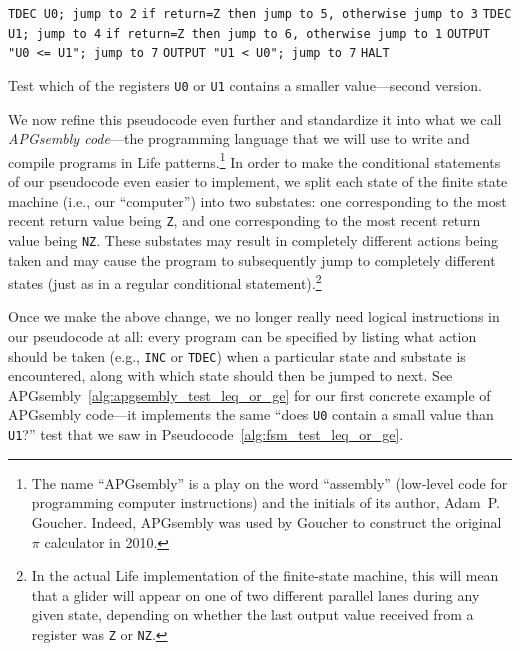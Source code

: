 \begin{pseudocode}
	\begin{algorithmic}[1]\small
		\State \texttt{TDEC U0; jump to 2}
		\State \texttt{if return=Z then jump to 5, otherwise jump to 3}
		\State \texttt{TDEC U1; jump to 4}
		\State \texttt{if return=Z then jump to 6, otherwise jump to 1}
		\State \texttt{OUTPUT "U0 <= U1"; jump to 7}
		\State \texttt{OUTPUT "U1 < U0"; jump to 7}
		\State \texttt{HALT}
	\end{algorithmic}
	\caption{Test which of the registers \texttt{U0} or \texttt{U1} contains a smaller value---second version.}\label{alg:fsm_test_leq_or_ge}
\end{pseudocode}

We now refine this pseudocode even further and standardize it into what we call \emph{APGsembly code}---the programming language that we will use to write and compile programs in Life patterns.\footnote{The name ``APGsembly'' is a play on the word ``assembly'' (low-level code for programming computer instructions) and the initials of its author, Adam~P. Goucher. Indeed, APGsembly was used by Goucher to construct the original $\pi$ calculator in 2010.} In order to make the conditional statements of our pseudocode even easier to implement, we split each state of the finite state machine (i.e., our ``computer'') into two substates: one corresponding to the most recent return value being \texttt{Z}, and one corresponding to the most recent return value being \texttt{NZ}. These substates may result in completely different actions being taken and may cause the program to subsequently jump to completely different states (just as in a regular conditional statement).\footnote{In the actual Life implementation of the finite-state machine, this will mean that a glider will appear on one of two different parallel lanes during any given state, depending on whether the last output value received from a register was \texttt{Z} or \texttt{NZ}.}

Once we make the above change, we no longer really need logical instructions in our pseudocode at all: every program can be specified by listing what action should be taken (e.g., \texttt{INC} or \texttt{TDEC}) when a particular state and substate is encountered, along with which state should then be jumped to next. See APGsembly~\ref{alg:apgsembly_test_leq_or_ge} for our first concrete example of APGsembly code---it implements the same ``does \texttt{U0} contain a small value than \texttt{U1}?'' test that we saw in Pseudocode~\ref{alg:fsm_test_leq_or_ge}.

